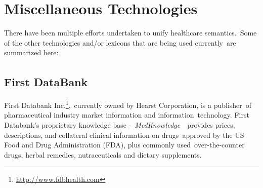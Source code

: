 \documentclass[DIV=calc, paper=a4, fontsize=12pt, onecolumn]{scrartcl}	 %
\begin{document}
  \section{Miscellaneous Technologies}
  \label{sec:misc}

  There have been multiple efforts undertaken to unify healthcare semantics.\
  Some of the other technologies and/or lexicons that are being used currently\
  are summarized here:

  \subsection{First DataBank\textsuperscript{\texttrademark}}
  \label{sec:fdb}
  First Databank Inc.\footnote{\url{http://www.fdbhealth.com}},\
  currently owned by Hearst Corporation, is a publisher\
  of pharmaceutical industry market information and information\
  technology. First Databank's proprietary knowledge base -\ 
  \emph{MedKnowledge}~\citep{first_databank_fdb_2013}\
  provides prices, descriptions, and collateral clinical information on drugs\
  approved by the US Food and Drug Administration (FDA), plus commonly used\
  over-the-counter drugs, herbal remedies, nutraceuticals and dietary supplements.\\


  
  {}

\end{document}
